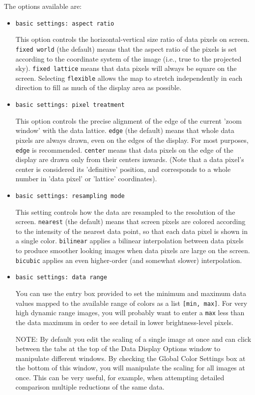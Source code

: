 The options available are:
\begin{itemize}

\item {\tt basic settings: aspect ratio}

This option controls the horizontal-vertical size ratio of data pixels
on screen.  {\tt fixed world} (the default) means that the aspect
ratio of the pixels is set according to the coordinate system of
the image (i.e., true to the projected sky). {\tt fixed lattice}
means that data pixels will always be square on the screen.  Selecting
{\tt flexible} allows the map to stretch independently in each
direction to fill as much of the display area as possible.

\item {\tt basic settings: pixel treatment}

This option controls the precise alignment of the edge of the current
'zoom window' with the data lattice.  {\tt edge} (the default) means
that whole data pixels are always drawn, even on the edges of the display.
For most purposes, {\tt edge} is recommended.  {\tt center} means that
data pixels on the edge of the display are drawn only from their centers
inwards. (Note that a data pixel's center is considered its 'definitive'
position, and corresponds to a whole number in 'data pixel' or 'lattice'
coordinates).

\item {\tt basic settings: resampling mode}

This setting controls how the data are resampled to the resolution of
the screen.  {\tt nearest} (the default) means that screen pixels are
colored according to the intensity of the nearest data point, so that
each data pixel is shown in a single color. {\tt bilinear} applies a
bilinear interpolation between data pixels to produce smoother looking images
when data pixels are large on the screen.  {\tt bicubic} applies an
even higher-order (and somewhat slower) interpolation.

\item {\tt basic settings: data range}

You can use the entry box provided to set the minimum and maximum data values
mapped to the available range of colors as a list {\tt [min, max]}.  
For very high dynamic range images,
you will probably want to enter a {\tt max} less than the data maximum 
in order to see detail in lower brightness-level pixels.

NOTE: By default you edit the scaling of a single image at once and
can click between the tabs at the top of the Data Display Options window
to manipulate different windows. By checking the Global Color Settings
box at the bottom of this window, you will manipulate the scaling for
all images at once. This can be very useful, for example, when attempting detailed
comparison multiple reductions of the same data.


\end{itemize}
